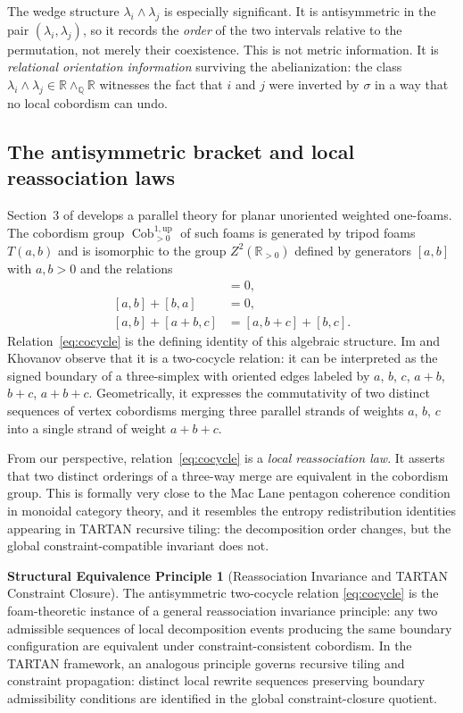 \documentclass[12pt, a4paper]{article}
\theoremstyle{plain}
\theoremstyle{definition}
\theoremstyle{correspondence}
\newtheorem{strucprin}[theorem]{Structural Equivalence Principle}
\DeclareMathOperator{\Cob}{Cob}
\newcommand{\RR}{\mathbb{R}}
\newcommand{\QQ}{\mathbb{Q}}
\newcommand{\wedgeQ}{\wedge_{\QQ}}
\begin{document}
The wedge structure $\lambda_i \wedge \lambda_j$ is especially significant. It is
antisymmetric in the pair $(\lambda_i, \lambda_j)$, so it records the \emph{order} of
the two intervals relative to the permutation, not merely their coexistence. This is not
metric information. It is \emph{relational orientation information} surviving the
abelianization: the class $\lambda_i \wedge \lambda_j \in \RR \wedgeQ \RR$ witnesses
the fact that $i$ and $j$ were inverted by $\sigma$ in a way that no local cobordism
can undo.

\subsection{The antisymmetric bracket and local reassociation laws}

Section~3 of \cite{IK24foam} develops a parallel theory for planar unoriented weighted
one-foams. The cobordism group $\Cob^{1,\mathrm{up}}_{>0}$ of such foams is generated
by tripod foams $T(a,b)$ and is isomorphic to the group $Z^2(\RR_{>0})$ defined by
generators $[a,b]$ with $a,b > 0$ and the relations
\begin{align}
[a,a] &= 0, \label{eq:antisym1} \\
[a,b] + [b,a] &= 0, \label{eq:antisym2} \\
[a,b] + [a+b,c] &= [a,b+c] + [b,c]. \label{eq:cocycle}
\end{align}
Relation~\eqref{eq:cocycle} is the defining identity of this algebraic structure. Im and
Khovanov observe that it is a two-cocycle relation: it can be interpreted as the signed
boundary of a three-simplex with oriented edges labeled by $a$, $b$, $c$, $a+b$, $b+c$,
$a+b+c$. Geometrically, it expresses the commutativity of two distinct sequences of
vertex cobordisms merging three parallel strands of weights $a$, $b$, $c$ into a single
strand of weight $a+b+c$.

From our perspective, relation~\eqref{eq:cocycle} is a \emph{local reassociation law}.
It asserts that two distinct orderings of a three-way merge are equivalent in the
cobordism group. This is formally very close to the Mac Lane pentagon coherence
condition in monoidal category theory, and it resembles the entropy redistribution
identities appearing in TARTAN recursive tiling: the decomposition order changes, but
the global constraint-compatible invariant does not.

\begin{strucprin}[Reassociation Invariance and TARTAN Constraint Closure]
\label{sp:tartan}
The antisymmetric two-cocycle relation \eqref{eq:cocycle} is the foam-theoretic
instance of a general reassociation invariance principle: any two admissible
sequences of local decomposition events producing the same boundary configuration
are equivalent under constraint-consistent cobordism. In the TARTAN framework, an
analogous principle governs recursive tiling and constraint propagation: distinct
local rewrite sequences preserving boundary admissibility conditions are identified
in the global constraint-closure quotient.
\end{strucprin}
\end{document}
